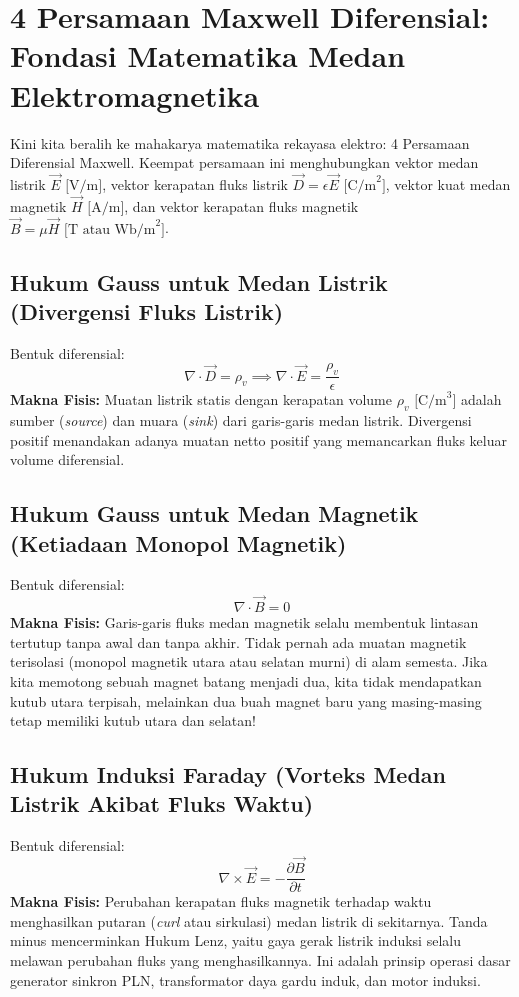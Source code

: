 \documentclass[11pt,a4paper]{article}
\theoremstyle{definition}
\begin{document}
\section{4 Persamaan Maxwell Diferensial: Fondasi Matematika Medan Elektromagnetika}

Kini kita beralih ke mahakarya matematika rekayasa elektro: 4 Persamaan Diferensial Maxwell. Keempat persamaan ini menghubungkan vektor medan listrik $\vec{E}\text{ [V/m]}$, vektor kerapatan fluks listrik $\vec{D} = \epsilon \vec{E}\text{ [C/m}^2\text{]}$, vektor kuat medan magnetik $\vec{H}\text{ [A/m]}$, dan vektor kerapatan fluks magnetik $\vec{B} = \mu \vec{H}\text{ [T atau Wb/m}^2\text{]}$.

\subsection{Hukum Gauss untuk Medan Listrik (Divergensi Fluks Listrik)}
Bentuk diferensial:
\begin{equation}
    \nabla \cdot \vec{D} = \rho_v \implies \nabla \cdot \vec{E} = \frac{\rho_v}{\epsilon}
    \label{eq:gauss_electric}
\end{equation}
\textbf{Makna Fisis:} Muatan listrik statis dengan kerapatan volume $\rho_v\text{ [C/m}^3\text{]}$ adalah sumber (\textit{source}) dan muara (\textit{sink}) dari garis-garis medan listrik. Divergensi positif menandakan adanya muatan netto positif yang memancarkan fluks keluar volume diferensial.

\subsection{Hukum Gauss untuk Medan Magnetik (Ketiadaan Monopol Magnetik)}
Bentuk diferensial:
\begin{equation}
    \nabla \cdot \vec{B} = 0
    \label{eq:gauss_magnetic}
\end{equation}
\textbf{Makna Fisis:} Garis-garis fluks medan magnetik selalu membentuk lintasan tertutup tanpa awal dan tanpa akhir. Tidak pernah ada muatan magnetik terisolasi (monopol magnetik utara atau selatan murni) di alam semesta. Jika kita memotong sebuah magnet batang menjadi dua, kita tidak mendapatkan kutub utara terpisah, melainkan dua buah magnet baru yang masing-masing tetap memiliki kutub utara dan selatan!

\subsection{Hukum Induksi Faraday (Vorteks Medan Listrik Akibat Fluks Waktu)}
Bentuk diferensial:
\begin{equation}
    \nabla \times \vec{E} = -\frac{\partial \vec{B}}{\partial t}
    \label{eq:faraday_law}
\end{equation}
\textbf{Makna Fisis:} Perubahan kerapatan fluks magnetik terhadap waktu menghasilkan putaran (\textit{curl} atau sirkulasi) medan listrik di sekitarnya. Tanda minus mencerminkan Hukum Lenz, yaitu gaya gerak listrik induksi selalu melawan perubahan fluks yang menghasilkannya. Ini adalah prinsip operasi dasar generator sinkron PLN, transformator daya gardu induk, dan motor induksi.
\end{document}
